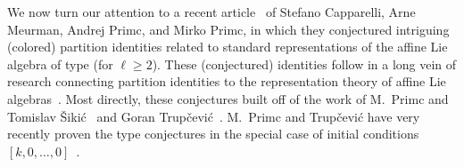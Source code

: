 \documentclass[10pt,a4paper]{amsart}
\numberwithin{equation}{section}
\theoremstyle{definition}
\begin{document}
We now turn our attention to a recent article~\cite{CMPP} of Stefano Capparelli, Arne Meurman, Andrej Primc, and Mirko Primc, in which they conjectured intriguing (colored) partition identi\-ties related to standard representations of the affine Lie algebra of type  (for $\ell\ge 2$). These (conjectured) identities follow in a long vein of research connecting partition identities to the representation theory of affine Lie algebras~\cite{Capp,KanRus-idf,KanRus-stair,LepWil-struI,MP87,MP,Nan-thesis,TakTsu-nandi}. Most directly, these conjectures built off of the work of M.~Primc and Tomislav \v{S}iki\'{c}~\cite{PS2,PS1} and Goran Trup\v{c}evi\'{c}~\cite{Tru}. M.~Primc and Trup\v{c}evi\'{c} have very recently proven the type  conjectures in the special case of initial conditions $[k,0,\dots,0]$~\cite{PT}.
\end{document}
